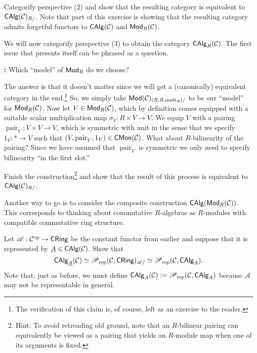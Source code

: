 \documentclass[11pt]{article}
\renewcommand{\C}{\mathcal{C}}
\renewcommand{\A}{\mathscr{A}}
\DeclareMathOperator{\mult}{mult} %
\DeclareMathOperator{\pair}{pair} %
\begin{document}
\begin{exercise}
Categorify perspective \textup{(2)} and show that the resulting category is equivalent to $\CAlg(\C)_{R/}$. Note that part of this exercise is showing that the resulting category admits forgetful functors to $\CAlg(\C)$ and $\Mod_R(\C)$.
\end{exercise}

We will now categorify perspective \textup{(3)} to obtain the category $\CAlg_R(\C)$. The first issue that presents itself can be phrased as a question.

\textbf{:} Which ``model'' of $\operatorname{\mathsf{Mod}}_R$ do we choose?

The answer is that it doesn't matter since we will get a (canonically) equivalent category in the end.\footnote{The verification of this claim is, of course, left as an exercise to the reader.} So, we simply take $\Mod(\C)_{(R,R,\mult_R)/}$ to be our ``model'' for $\Mod_R(\C)$. Now let $V\in\Mod_R(\C)$, which by definition comes equipped with a suitable scalar multiplication map $\sigma_V: R\times V\to V$. We equip $V$ with a pairing $\pair_V: V\times V\to V$, which is symmetric with unit in the sense that we specify $1_V: *\to V$ such that $(V,\pair_V,1_V)\in\CMon(\C)$. What about $R$-bilinearity of the pairing? Since we have assumed that $\pair_V$ is symmetric we only need to specify bilinearity ``in the first slot.''

\begin{exercise}
Finish the construction\footnote{Hint: To avoid retreading old ground, note that an $R$-bilinear pairing can equivalently be viewed as a pairing that yields an $R$-module map when one of its arguments is fixed.} and show that the result of this process is equivalent to $\CAlg(\C)_{R/}$.
\end{exercise}

\begin{remark}
Another way to go is to consider the composite construction $\CAlg(\Mod_R(\C))$. This corresponds to thinking about commutative $R$-algebras as $R$-modules with compatible commutative ring structure.
\end{remark}

\begin{exercise}
Let $\A: \C^{\op}\to\CRing$ be the constant functor from earlier and suppose that it is represented by $\un{A}\in\CAlg(\C)$. Show that 
$$\CAlg_{\un{A}}(\C)\simeq\Pre_{\rep}(\C,\CRing)_{\A/}\simeq\Pre_{\rep}(\C,\CAlg_A).$$
Note that, just as before, we must define $\CAlg_A(\C):=\Pre_{\rep}(\C,\CAlg_A)$ because $\A$ may not be representable in general.
\end{exercise}
\end{document}
